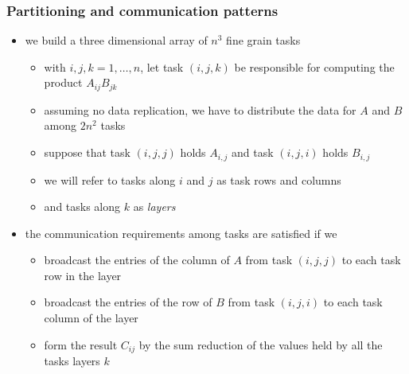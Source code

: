 \begin{frame}[fragile]
%
  \frametitle{Partitioning and communication patterns}
%
  \begin{itemize}
%
  \item we build a three dimensional array of $n^{3}$ fine grain tasks
    \begin{itemize}
    \item with $i,j,k = 1,\ldots,n$, let task $(i,j,k)$ be responsible for computing the
      product $A_{ij}B_{jk}$
    \item assuming no data replication, we have to distribute the data for $A$ and $B$ among
      $2n^{2}$ tasks
    \item suppose that task $(i,j,j)$ holds $A_{i,j}$ and task $(i,j,i)$ holds $B_{i,j}$
    \item we will refer to tasks along $i$ and $j$ as task rows and columns
    \item and tasks along $k$ as {\em layers}
    \end{itemize}
%
  \item the communication requirements among tasks are satisfied if we
    \begin{itemize}
    \item broadcast the entries of the  column of $A$ from task $(i,j,j)$ to each task
      row in the  layer
    \item broadcast the entries of the  row of $B$ from task $(i,j,i)$ to each task column of
      the  layer
    \item form the result $C_{ij}$ by the sum reduction of the values held by all the
      tasks layers $k$
    \end{itemize}
%
  \end{itemize}
%
\end{frame}

